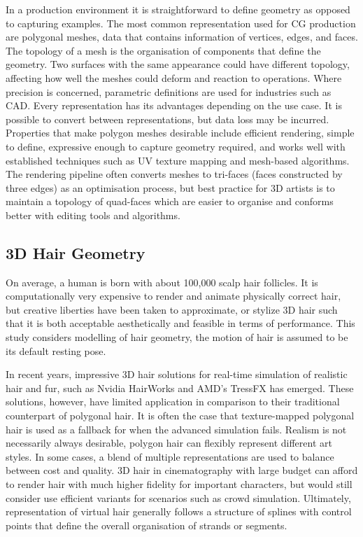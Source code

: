 \documentclass[ %
                    author={Dillon Keith Diep [INCOMPLETE DRAFT, NOT FOR SUBMISSION]},
                supervisor={Dr. Carl Henrik Ek},
                    degree={MEng},
                     title={ART-CG:},
                  subtitle={Assisted Real-Time Content Generation of 3D Hair Geometry},
                      type={Research},
                      year={2014} ]{dissertation}
\begin{document}
In a production environment it is straightforward to define geometry as opposed to capturing examples. The most common representation used for CG production are polygonal meshes, data that contains information of vertices, edges, and faces. The topology of a mesh is the organisation of components that define the geometry. Two surfaces with the same appearance could have different topology, affecting how well the meshes could deform and reaction to operations. Where precision is concerned, parametric definitions are used for industries such as CAD. Every representation has its advantages depending on the use case. It is possible to convert between representations, but data loss may be incurred. Properties that make polygon meshes desirable include efficient rendering, simple to define, expressive enough to capture geometry required, and works well with established techniques such as UV texture mapping and mesh-based algorithms. The rendering pipeline often converts meshes to tri-faces (faces constructed by three edges) as an optimisation process, but best practice for 3D artists is to maintain a topology of quad-faces which are easier to organise and conforms better with editing tools and algorithms.


\subsection{3D Hair Geometry}
On average, a human is born with about 100,000 scalp hair follicles. \cite{hairfollicles} It is computationally very expensive to render and animate physically correct hair, but creative liberties have been taken to approximate, or stylize 3D hair such that it is both acceptable aesthetically and feasible in terms of performance. This study considers modelling of hair geometry, the motion of hair is assumed to be its default resting pose.

In recent years, impressive 3D hair solutions for real-time simulation of realistic hair and fur, such as Nvidia HairWorks and AMD’s TressFX has emerged. These solutions, however, have limited application in comparison to their traditional counterpart of polygonal hair. It is often the case that texture-mapped polygonal hair is used as a fallback for when the advanced simulation fails. Realism is not necessarily always desirable, polygon hair can flexibly represent different art styles. In some cases, a blend of multiple representations are used to balance between cost and quality. 3D hair in cinematography with large budget can afford to render hair with much higher fidelity for important characters, but would still consider use efficient variants for scenarios such as crowd simulation. Ultimately, representation of virtual hair generally follows a structure of splines with control points that define the overall organisation of strands or segments.
\end{document}
